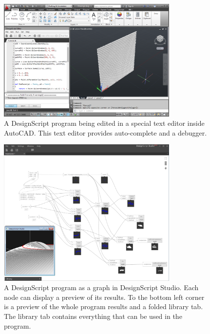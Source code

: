 \begin{figure}
	\centering
	\includegraphics[width=0.8\textwidth]{images/ds_autocad}
	\caption[A DesignScript program being edited in a special text editor inside AutoCAD.]{A DesignScript program being edited in a special text editor inside AutoCAD. This text editor provides auto-complete and a debugger.}
	\label{fig:ds:autocad}
\end{figure}

\begin{figure}
	\centering
	\includegraphics[width=0.8\textwidth]{images/ds_dsstudio}
	\caption[A DesignScript program as a graph in DesignScript Studio.]{A DesignScript program as a graph in DesignScript Studio. Each node can display a preview of its results. To the bottom left corner is a preview of the whole program results and a folded library tab. The library tab contains everything that can be used in the program.}
	\label{fig:ds:dsstudio}
\end{figure}

